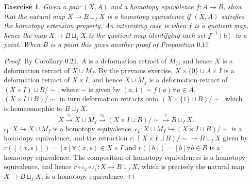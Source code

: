 \documentclass{article}
\newtheorem{exercise}[theorem]{Exercise}
\begin{document}
\begin{exercise}
Given a pair $(X,A)$ and a homotopy equivalence $f:A\to B$, show that the natural map $X\to B\sqcup_fX$ is a homotopy equivalence if $(X,A)$ satisfies the homotopy extension property. An interesting case is when $f$ is a quotient map, hence the map $X\to B\sqcup_f X$ is the quotient map identifying each set $f^{-1}(b)$ to a point. When $B$ is a point this gives another proof of Proposition $0.17$.
\end{exercise}
\begin{proof}
By Corollary $0.21$, $A$ is a deformation retract of $M_f$, and hence $X$ is a deformation retract of $X\cup M_f$. By the previous exercise, $X\times\{0\}\cup A\times I$ is a deformation retract of $X\times I$, and hence $X\cup M_f$ is a deformation retract of $(X\times I)\sqcup B/\sim$, where $\sim$ is given by $(a,1)\sim f(a)\forall a\in A$. $(X\times I\sqcup B)/\sim$ in turn deformation retracts onto $(X\times\{1\}\sqcup B)/\sim$, which is homeomorphic to $B\sqcup_fX$.\[X\overset{\iota_1}{\longrightarrow} X\cup M_f\overset{\iota_2}{\longrightarrow} (X\times I\sqcup B)/\sim\overset{r}{\longrightarrow} B\sqcup_fX.\] $\iota_1:X\hookrightarrow X\cup M_f$ is a homotopy equivalence, $\iota_2:X\cup M_f\hookrightarrow (X\times I\sqcup B)/\sim$ is a homotopy equivalence, and the retraction $r:(X\times I\sqcup B)/\sim\to B\sqcup _fX$ given by $r([(x,s)])=[x]\forall (x,s)\in X\times I$ and $r([b])=[b]\forall b\in B$ is a homotopy equivalence. The composition of homotopy equivalences is a homotopy equivalence, and hence $r\circ \iota_2\circ\iota_1:X\to B\sqcup_fX$, which is precisely the natural map $X\to B\sqcup_fX$, is a homotopy equivalence.
\end{proof}
\end{document}
